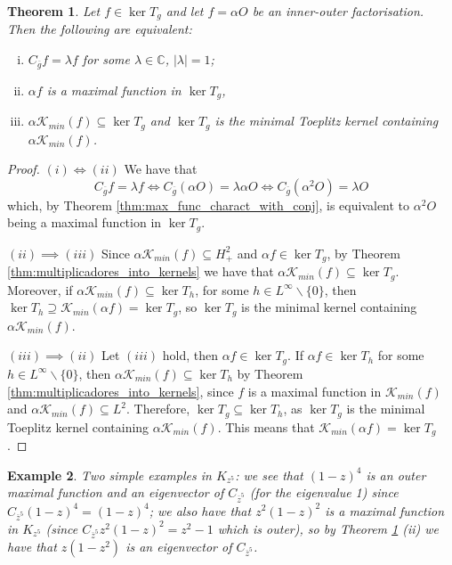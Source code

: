\documentclass[12pt]{elsarticle}
\numberwithin{equation}{section}
\theoremstyle{plain}
\newtheorem{thm}{Theorem}[section]
\newtheorem{ex}[thm]{Example}
\newcommand{\Hp}{\ensuremath{H^2_+}}
\newcommand{\Linf}{\ensuremath{L^\infty}}
\newcommand{\CC}{\ensuremath{\mathbb{C}}}
\newcommand{\KKmin}{\ensuremath{\mathcal{K}_{min}}}
\newcommand{\Cg}{\ensuremath{C_{\ol g}}}
\newcommand{\ol}[1]{\ensuremath{\overline{#1}}}
\newcommand{\bs}{\backslash}
\newcommand{\zero}{\ensuremath{\{0\}}}
\renewcommand{\subset}{\subseteq}
\renewcommand{\supset}{\supseteq}
\begin{document}
\begin{thm}
\label{thm:Cg_eigenfunctions}
Let $f\in\ker T_g$ and let $f=\alpha O$ be an inner-outer factorisation.
Then the following are equivalent:
\begin{enumerate}[(i)]
\item $\Cg f = \lambda f$ for some $\lambda\in\CC$, $|\lambda|=1$;

\item $\alpha f$ is a maximal function in $\ker T_g$,

\item $\alpha \KKmin (f) \subset \ker T_g$ and $\ker T_g$ is the minimal Toeplitz kernel containing $\alpha \KKmin (f)$.
\end{enumerate}
\end{thm}


\begin{proof}
$(i) \iff (ii)$
We have that 
\begin{equation*}
\Cg f = \lambda f \iff \Cg (\alpha O) = \lambda \alpha O \iff \Cg (\alpha^2 O) = \lambda O
\end{equation*}
which, by Theorem \ref{thm:max_func_charact_with_conj}, is equivalent to $\alpha^2 O$ being a maximal function in $\ker T_g$.

$(ii)\implies (iii)$
Since $\alpha \KKmin (f) \subset \Hp$ and $\alpha f \in \ker T_g$, by Theorem \ref{thm:multiplicadores_into_kernels} we have that $\alpha \KKmin (f) \subset \ker T_g$.
Moreover, if $\alpha \KKmin (f) \subset \ker T_h$, for some $h\in\Linf\bs\zero$, then $\ker T_h \supset \KKmin (\alpha f) = \ker T_g$, so $\ker T_g$ is the minimal kernel containing $\alpha \KKmin (f)$.

$(iii)\implies (ii)$ Let $(iii)$ hold, then $\alpha f \in \ker T_g$.
If $\alpha f \in \ker T_h$ for some $h\in\Linf\bs\zero$, then $\alpha \KKmin (f) \subset \ker T_h$ by Theorem \ref{thm:multiplicadores_into_kernels}, since $f$ is a maximal function in $\KKmin (f)$ and $\alpha \KKmin (f) \subset L^2$.
Therefore, $\ker T_g \subset \ker T_h$, as $\ker T_g$ is the minimal Toeplitz kernel containing $\alpha \KKmin (f)$.
This means that $\KKmin (\alpha f) = \ker T_g$.
\end{proof}

\begin{ex}
Two simple examples in $K_{z^5}$:
we see that $(1-z)^4$ is an outer maximal function and an eigenvector of $C_{\ol z^5}$ (for the eigenvalue 1) since $C_{\ol z^5} (1-z)^4 = (1-z)^4$;
we also have that $z^2(1-z)^2$ is a maximal function in $K_{z^5}$ (since $C_{\ol z^5} z^2(1-z)^2 = z^2-1$ which is outer), so by Theorem \ref{thm:Cg_eigenfunctions} (ii) we have that $z(1-z^2)$ is an eigenvector of $C_{\ol z^5}$.
\end{ex}
\end{document}
